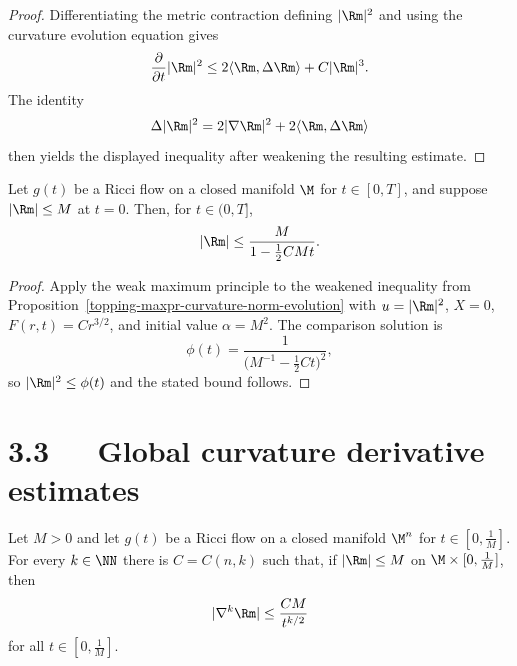 \begin{proof}
\sketch Differentiating the metric contraction defining $|\Rm|^2$ and using
the curvature evolution equation gives
\[
\frac{\partial}{\partial t}|\Rm|^2
\leq2\langle\Rm,\Delta\Rm\rangle+C|\Rm|^3.
\]
The identity
\[
\Delta|\Rm|^2=2|\nabla\Rm|^2+2\langle\Rm,\Delta\Rm\rangle
\]
then yields the displayed inequality after weakening the resulting estimate.
\end{proof}

\begin{theorem}
\label{topping-maxpr-curvature-norm-bound}
Let $g(t)$ be a Ricci flow on a closed manifold $\M$ for $t\in[0,T]$, and
suppose $|\Rm|\leq M$ at $t=0$. Then, for $t\in(0,T]$,
\[
|\Rm|\leq\frac{M}{1-\frac12CMt}.
\]
\end{theorem}

\begin{proof}
\sketch Apply the weak maximum principle to the weakened inequality from
Proposition~\ref{topping-maxpr-curvature-norm-evolution} with $u=|\Rm|^2$, $X=0$, $F(r,t)=Cr^{3/2}$, and initial
value $\alpha=M^2$. The comparison solution is
\[
\phi(t)=\frac{1}{\bigl(M^{-1}-\frac12Ct\bigr)^2},
\]
so $|\Rm|^2\leq\phi(t)$ and the stated bound follows.
\end{proof}

\section*{3.3\ \ \ Global curvature derivative estimates}

\begin{theorem}
\label{topping-maxpr-first-derivative-estimate}
Let $M>0$ and let $g(t)$ be a Ricci flow on a closed manifold $\M^n$ for
$t\in[0,\frac1M]$. For every $k\in\NN$ there is $C=C(n,k)$ such that, if
$|\Rm|\leq M$ on $\M\times[0,\frac1M]$, then
\[
|\nabla^k\Rm|\leq\frac{CM}{t^{k/2}}
\]
for all $t\in[0,\frac1M]$.
\end{theorem}

